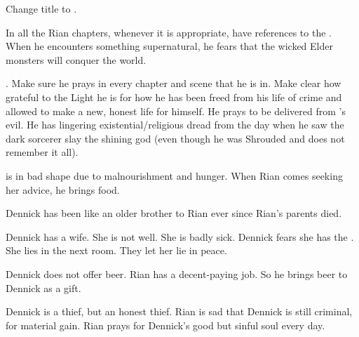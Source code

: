 \begin{changes}
  \begin{comment}\paragraph{Trinity of Plagues}\end{comment}
    Change title to . 
    
    In all the Rian chapters, whenever it is appropriate, have references to the . 
    When he encounters something supernatural, he fears that the wicked Elder monsters will conquer the world. 
    
    .
    Make sure he prays in every chapter and scene that he is in.
    Make clear how grateful to the Light he is for how he has been freed from his life of crime and allowed to make a new, honest life for himself.
    He prays to be delivered from \Isphet's evil. 
    He has lingering existential/religious dread from the day when he saw the dark sorcerer slay the shining god (even though he was Shrouded and does not remember it all). 
    
    \Uswa is in bad shape due to malnourishment and hunger.
    When Rian comes seeking her advice, he brings food.
    
    Dennick has been like an older brother to Rian ever since Rian's parents died. 
    
    Dennick has a wife. 
    She is not well.
    She is badly sick.
    Dennick fears she has the . 
    She lies in the next room.
    They let her lie in peace.
    
    Dennick does not offer beer. 
    Rian has a decent-paying job.
    So he brings beer to Dennick as a gift. 
    
    Dennick is a thief, but an honest thief. 
    Rian is sad that Dennick is still criminal,  for material gain.
    Rian prays for Dennick's good but sinful soul every day. 
  \begin{comment}
  \paragraph{The \Qliphoth Lie Ever in Wait}
  \end{comment}
    

\end{changes}
